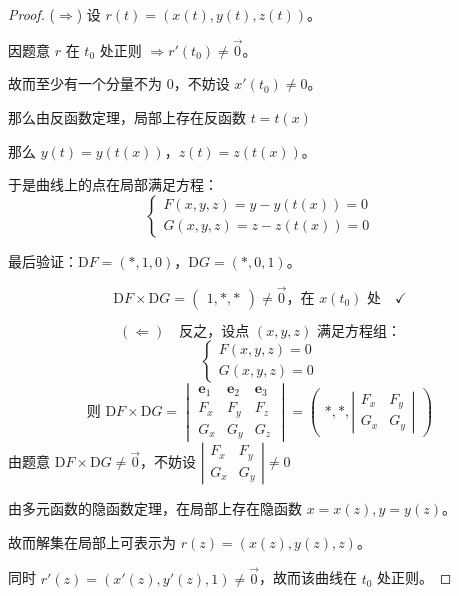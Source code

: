 \documentclass[lang=cn,10pt,thmcnt=section]{elegantbook}
\begin{document}
\begin{proof}
    ($\Rightarrow$) 设 $r(t) = (x(t), y(t), z(t))$。

因题意 $r$ 在 $t_0$ 处正则 $\Rightarrow r'(t_0) \neq \vec{0}$。

故而至少有一个分量不为 $0$，不妨设 $x'(t_0) \neq 0$。

那么由反函数定理，局部上存在反函数 $t = t(x)$

那么 $y(t) = y(t(x))$，$z(t) = z(t(x))$。

于是曲线上的点在局部满足方程：
\[
\begin{cases}
F(x, y, z) = y - y(t(x)) = 0 \\
G(x, y, z) = z - z(t(x)) = 0
\end{cases}
\]

最后验证：$\text{D}F = (*, 1, 0)$，$\text{D}G = (*, 0, 1)$。

\[
\text{D}F \times \text{D}G = \begin{pmatrix} 1, *, * \end{pmatrix} \neq \vec{0} \text{，在 } x(t_0) \text{ 处} \quad \checkmark
\]

\[
(\Leftarrow) \quad \text{反之，设点 } (x, y, z) \text{ 满足方程组：}
\]
\[
\begin{cases}
F(x, y, z) = 0 \\
G(x, y, z) = 0
\end{cases}
\]
\[
\text{则 } \text{D}F \times \text{D}G = \begin{vmatrix}
\mathbf{e}_1 & \mathbf{e}_2 & \mathbf{e}_3 \\
F_x & F_y & F_z \\
G_x & G_y & G_z
\end{vmatrix} = \begin{pmatrix} *, *, \left| \begin{matrix} F_x & F_y \\ G_x & G_y \end{matrix} \right| \end{pmatrix}
\]
由题意 $\text{D}F \times \text{D}G \neq \vec{0}$，不妨设 $\left| \begin{matrix} F_x & F_y \\ G_x & G_y \end{matrix} \right| \neq 0$

由多元函数的隐函数定理，在局部上存在隐函数 $x = x(z), y = y(z)$。
 
故而解集在局部上可表示为 $r(z) = (x(z), y(z), z)$。

同时 $r'(z) = (x'(z), y'(z), 1) \neq \vec{0}$，故而该曲线在 $t_0$ 处正则。
\end{proof}
\end{document}
